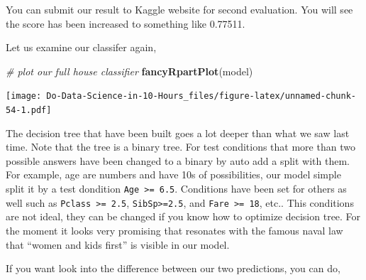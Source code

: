 \documentclass[
]{book}
\newenvironment{Shaded}{\begin{snugshade}}{\end{snugshade}}
\newcommand{\CommentTok}[1]{\textcolor[rgb]{0.56,0.35,0.01}{\textit{#1}}}
\newcommand{\DataTypeTok}[1]{\textcolor[rgb]{0.13,0.29,0.53}{#1}}
\newcommand{\DecValTok}[1]{\textcolor[rgb]{0.00,0.00,0.81}{#1}}
\newcommand{\KeywordTok}[1]{\textcolor[rgb]{0.13,0.29,0.53}{\textbf{#1}}}
\newcommand{\NormalTok}[1]{#1}
\newcommand{\OperatorTok}[1]{\textcolor[rgb]{0.81,0.36,0.00}{\textbf{#1}}}
\newcommand{\StringTok}[1]{\textcolor[rgb]{0.31,0.60,0.02}{#1}}
\begin{document}
You can submit our result to Kaggle website for second evaluation. You will see the score has been increased to something like 0.77511.

Let us examine our classifer again,

\begin{Shaded}
\begin{Highlighting}[]
\CommentTok{# plot our full house classifier }
\KeywordTok{fancyRpartPlot}\NormalTok{(model)}
\end{Highlighting}
\end{Shaded}

\texttt{[image: Do-Data-Science-in-10-Hours\_files/figure-latex/unnamed-chunk-54-1.pdf]}

The decision tree that have been built goes a lot deeper than what we saw last time. Note that the tree is a binary tree. For test conditions that more than two possible answers have been changed to a binary by auto add a split with them. For example, age are numbers and have 10s of possibilities, our model simple split it by a test dondition \texttt{Age\ \textgreater{}=\ 6.5}. Conditions have been set for others as well such as \texttt{Pclass\ \textgreater{}=\ 2.5}, \texttt{SibSp\textgreater{}=2.5}, and \texttt{Fare\ \textgreater{}=\ 18}, etc.. This conditions are not ideal, they can be changed if you know how to optimize decision tree. For the moment it looks very promising that resonates with the famous naval law that ``women and kids first'' is visible in our model.

If you want look into the difference between our two predictions, you can do,

\begin{Shaded}
\end{Shaded}
\end{document}
